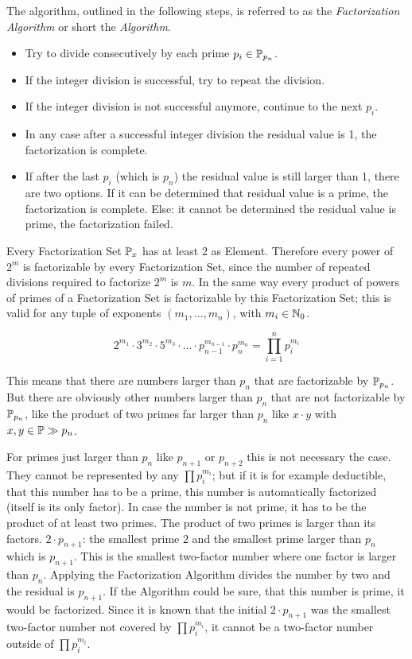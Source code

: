 \documentclass[a4paper,10pt]{article}
\begin{document}

The algorithm, outlined in the following steps, is referred to as the \emph{Factorization Algorithm}
or short the \emph{Algorithm}.

\begin{itemize}
 \item Try to divide consecutively by each prime $p_i \in \mathbb{P}_{p_n}$.
 \item If the integer division is successful, try to repeat the division.
 \item If the integer division is not successful anymore, continue to the next $p_i$.
 \item In any case after a successful integer division the residual value is 1, the factorization is complete.
 \item If after the last $p_i$ (which is $p_n$) the residual value is still larger than 1,
 there are two options.
 If it can be determined that residual value is a prime, the factorization is complete.
 Else: it cannot be determined the residual value is prime, the factorization failed.
\end{itemize}


Every Factorization Set $\mathbb{P}_x$ has at least 2 as Element.
Therefore every power of $2^m$ is factorizable by every Factorization Set,
since the number of repeated divisions required to factorize $2^m$ is $m$.
In the same way every product of powers of primes of a Factorization Set
is factorizable by this Factorization Set;
this is valid for any tuple of exponents $(m_1, \dots, m_n)$, with $m_i \in \mathbb{N}_0$.

$$2^{m_1} \cdot 3^{m_2} \cdot 5^{m_3} \cdot \ldots \cdot p_{n-1}^{m_{n-1}} \cdot p_n^{m_n}
= \prod_{i=1}^n p_i^{m_i} $$

This means that there are numbers larger than $p_n$ that are factorizable by $\mathbb{P}_{p_n}$.
But there are obviously other numbers larger than $p_n$ that are not factorizable by $\mathbb{P}_{p_n}$,
like the product of two primes far larger than $p_n$ like $x \cdot y$ with $x,y \in \mathbb{P} \gg p_n$.

For primes just larger than $p_n$ like $p_{n+1}$ or $p_{n+2}$ this is not necessary the case.
They cannot be represented by any $\prod p_i^{m_i}$;
but if it is for example deductible, that this number has to be a prime,
this number is automatically factorized (itself is its only factor).
In case the number is not prime, it has to be the product of at least two primes.
The product of two primes is larger than its factors.
$2 \cdot p_{n+1}$:
the smallest prime $2$ and the smallest prime larger than $p_n$ which is $p_{n+1}$.
This is the smallest two-factor number where one factor is larger than $p_n$.
Applying the Factorization Algorithm divides the number by two and the residual is $p_{n+1}$.
If the Algorithm could be sure, that this number is prime, it would be factorized.
Since it is known that the initial $2 \cdot p_{n+1}$ was the smallest two-factor number
not covered by $\prod p_i^{m_i}$, it cannot be a two-factor number outside of $\prod p_i^{m_i}$.
\end{document}
